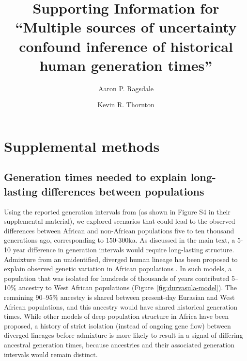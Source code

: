\documentclass[]{article}
\title{Supporting Information for
``Multiple sources of uncertainty confound inference of
historical human generation times''}
\author[1,*]{Aaron P. Ragsdale}
\author[2]{Kevin R. Thornton}
\affil[1]{University of Wisconsin--Madison, Wisconsin, USA}
\affil[2]{University of California, Irvine, California, USA}
\affil[*]{apragsdale@wisc.edu}
\begin{document}
\maketitle

\renewcommand{\thefigure}{S\arabic{figure}}
\renewcommand{\thetable}{S\arabic{table}}
\renewcommand{\theequation}{S\arabic{equation}}
\setcounter{figure}{0}
\setcounter{table}{0}
\setcounter{equation}{0}

\section*{Supplemental methods}

\subsection*{Generation times needed to explain long-lasting
differences between populations}

Using the reported generation intervals from \citet{wang2023human} (as shown in
Figure S4 in their supplemental material), we explored scenarios that could
lead to the observed differences between African and non-African populations
five to ten thousand generations ago, corresponding to 150-300ka. As discussed
in the main text, a 5-10 year difference in generation intervals would require
long-lasting structure. Admixture from an unidentified, diverged human lineage
has been proposed to explain observed genetic variation in African populations
\citep[e.g.,][but see \citet{ragsdale2023weakly} for alternative models that
allow for ongoing gene flow between
lineages]{hey2018phylogeny,durvasula2020recovering,lorente2019whole}. In such
models, a population that was isolated for hundreds of thousands of years
contributed 5--10\% ancestry to West African populations
(Figure~\ref{fig:durvasula-model}). The remaining 90--95\% ancestry is shared
between present-day Eurasian and West African populations, and this ancestry
would have shared historical generation times. While other models of deep
population structure in Africa have been proposed, a history of strict
isolation (instead of ongoing gene flow) between diverged lineages before
admixture is more likely to result in a signal of differing ancestral
generation times, because ancestries and their associated generation intervals
would remain distinct.
\end{document}
